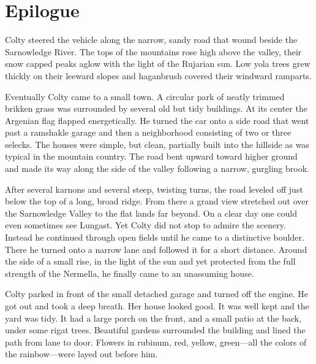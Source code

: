 

\chapter*{Epilogue}

Colty steered the vehicle along the narrow, sandy road that wound beside the Sarnowledge River.
The tops of the mountains rose high above the valley, their snow capped peaks aglow with the
light of the Rujarian sun. Low yola trees grew thickly on their leeward slopes and haganbrush
covered their windward ramparts.

Eventually Colty came to a small town. A circular park of neatly trimmed brikken grass was
surrounded by several old but tidy buildings. At its center the Argenian flag flapped
energetically. He turned the car onto a side road that went past a ramshakle garage and then a
neighborhood consisting of two or three selecks. The houses were simple, but clean, partially
built into the hillside as was typical in the mountain country. The road bent upward toward
higher ground and made its way along the side of the valley following a narrow, gurgling brook.

After several karnons and several steep, twisting turns, the road leveled off just below the top
of a long, broad ridge. From there a grand view stretched out over the Sarnowledge Valley to the
flat lands far beyond. On a clear day one could even sometimes see Lungast. Yet Colty did not
stop to admire the scenery. Instead he continued through open fields until he came to a
distinctive boulder. There he turned onto a narrow lane and followed it for a short distance.
Around the side of a small rise, in the light of the sun and yet protected from the full
strength of the Nermella, he finally came to an unassuming house.

Colty parked in front of the small detached garage and turned off the engine. He got out and
took a deep breath. Her house looked good. It was well kept and the yard was tidy. It had a
large porch on the front, and a small patio at the back, under some rigat trees. Beautiful
gardens surrounded the building and lined the path from lane to door. Flowers in rubinum, red,
yellow, green---all the colors of the rainbow---were layed out before him.

